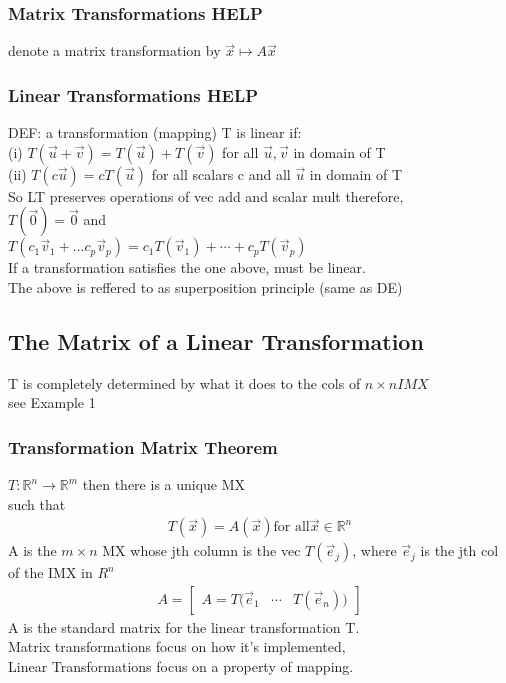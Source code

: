 \documentclass[12pt]{article}
\newcommand{\R}{\mathbb{R}}
\begin{document}
    \subsubsection{Matrix Transformations HELP}
        denote a matrix transformation by $ \vec x  \mapsto A\vec x$  
    \subsubsection{Linear Transformations HELP }
        DEF: a transformation (mapping) T is linear if: \\
        (i) $ T(\vec u + \vec v) = T(\vec u) + T(\vec v)$ for all
        $ \vec u,\vec v $  in domain of T \\
        (ii) $ T(c\vec u) = cT(\vec u) $ for all scalars c and all 
        $ \vec u $  in domain of T \\
        So LT preserves operations of vec add and scalar mult therefore,\\
        $ T(\vec 0) = \vec 0$ and \\
        $ T(c_{1}\vec v_{1}+... c_{p}\vec v_{p}) = 
        c_{1}T(\vec v_{1})+\cdots+ c_{p}T(\vec v_{p})$ \\
        If a transformation satisfies the one above, must be linear. \\
        The above is reffered to as superposition principle (same as DE)
\subsection{The Matrix of a Linear Transformation}
    T is completely determined by what it does to the 
    cols of $ n \times n IMX $ \\
    see Example 1
    \subsubsection{Transformation Matrix Theorem}
         $T: \R^n \rightarrow \R^m$ then there is a unique MX \\
         such that 
         \begin{align*}
             T(\vec x) = A(\vec x) \text{for all} \vec x\in\R^n
         \end{align*}
         A is the $ m \times n $  MX whose jth column is the vec
         $ T(\vec e_j) $, where $ \vec e_j $  is the  jth col of the IMX in
         $ R^n $ 
         \begin{align*}
             A = 
             \begin{bmatrix}
                 A = T(\vec e_{1}&\cdots&T(\vec e_{n}))
             \end{bmatrix}
         \end{align*}
        A is the standard matrix for the linear transformation T. \\
        Matrix transformations focus on how it's implemented, \\
        Linear Transformations focus on a property of mapping.
\end{document}
